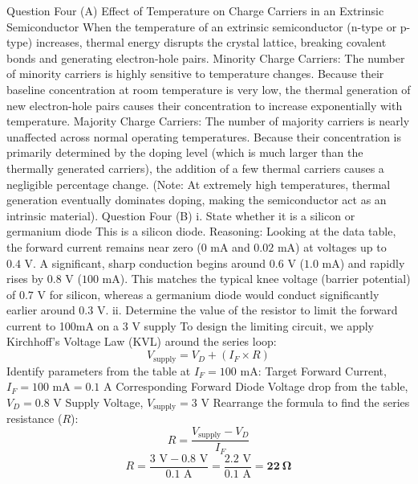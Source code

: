 Question Four (A)
Effect of Temperature on Charge Carriers in an Extrinsic Semiconductor
When the temperature of an extrinsic semiconductor (n-type or p-type) increases, thermal energy disrupts the crystal lattice, breaking covalent bonds and generating electron-hole pairs.
Minority Charge Carriers: The number of minority carriers is highly sensitive to temperature changes. Because their baseline concentration at room temperature is very low, the thermal generation of new electron-hole pairs causes their concentration to increase exponentially with temperature.
Majority Charge Carriers: The number of majority carriers is nearly unaffected across normal operating temperatures. Because their concentration is primarily determined by the doping level (which is much larger than the thermally generated carriers), the addition of a few thermal carriers causes a negligible percentage change.
(Note: At extremely high temperatures, thermal generation eventually dominates doping, making the semiconductor act as an intrinsic material).
Question Four (B)
i. State whether it is a silicon or germanium diode
This is a silicon diode.
Reasoning: Looking at the data table, the forward current remains near zero ($0\text{ mA}$ and $0.02\text{ mA}$) at voltages up to $0.4\text{ V}$. A significant, sharp conduction begins around $0.6\text{ V}$ ($1.0\text{ mA}$) and rapidly rises by $0.8\text{ V}$ ($100\text{ mA}$). This matches the typical knee voltage (barrier potential) of $0.7\text{ V}$ for silicon, whereas a germanium diode would conduct significantly earlier around $0.3\text{ V}$.
ii. Determine the value of the resistor to limit the forward current to 100mA on a 3 V supply
To design the limiting circuit, we apply Kirchhoff's Voltage Law (KVL) around the series loop:
$$V_{\text{supply}} = V_D + (I_F \times R)$$ 
Identify parameters from the table at $I_F = 100\text{ mA}$:
Target Forward Current, $I_F = 100\text{ mA} = 0.1\text{ A}$
Corresponding Forward Diode Voltage drop from the table, $V_D = 0.8\text{ V}$
Supply Voltage, $V_{\text{supply}} = 3\text{ V}$
Rearrange the formula to find the series resistance ($R$):
$$R = \frac{V_{\text{supply}} - V_D}{I_F}$$ 
$$R = \frac{3\text{ V} - 0.8\text{ V}}{0.1\text{ A}} = \frac{2.2\text{ V}}{0.1\text{ A}} = \mathbf{22\ \Omega}$$ 
